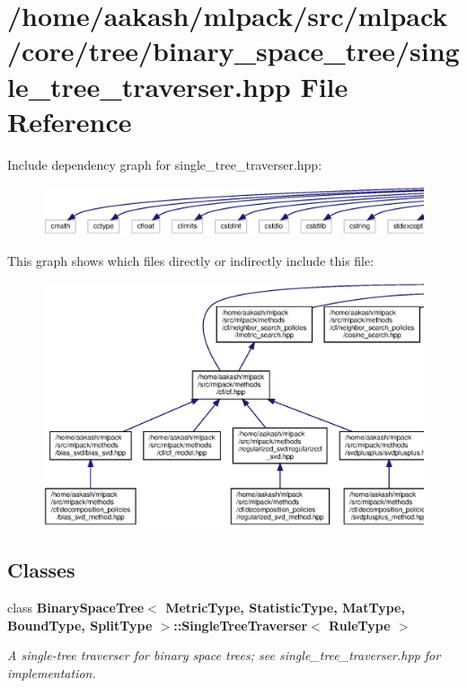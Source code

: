 \section{/home/aakash/mlpack/src/mlpack/core/tree/binary\+\_\+space\+\_\+tree/single\+\_\+tree\+\_\+traverser.hpp File Reference}
\label{binary__space__tree_2single__tree__traverser_8hpp}
Include dependency graph for single\+\_\+tree\+\_\+traverser.\+hpp\+:
\nopagebreak
\begin{figure}[H]
\begin{center}
\leavevmode
\includegraphics[width=350pt]{binary__space__tree_2single__tree__traverser_8hpp__incl}
\end{center}
\end{figure}
This graph shows which files directly or indirectly include this file\+:
\nopagebreak
\begin{figure}[H]
\begin{center}
\leavevmode
\includegraphics[width=350pt]{binary__space__tree_2single__tree__traverser_8hpp__dep__incl}
\end{center}
\end{figure}
\subsection*{Classes}
\begin{DoxyCompactItemize}
\item 
class \textbf{ Binary\+Space\+Tree$<$ Metric\+Type, Statistic\+Type, Mat\+Type, Bound\+Type, Split\+Type $>$\+::\+Single\+Tree\+Traverser$<$ Rule\+Type $>$}
\begin{DoxyCompactList}\small\item\em A single-\/tree traverser for binary space trees; see single\+\_\+tree\+\_\+traverser.\+hpp for implementation. \end{DoxyCompactList}\end{DoxyCompactItemize}
